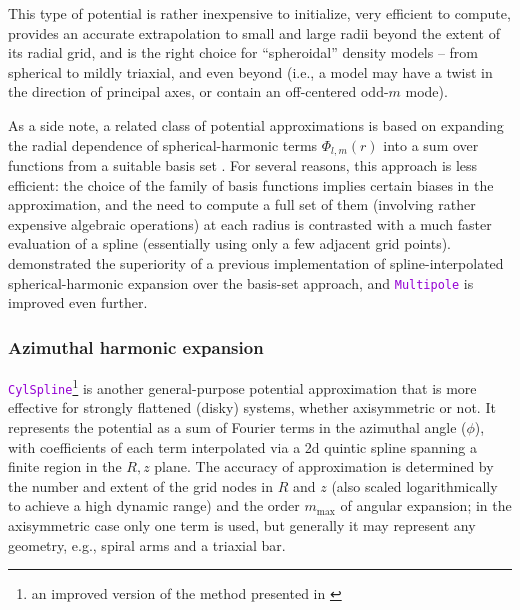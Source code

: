 \documentclass[12pt]{article}
\newcommand{\ttt}[1]{\textcolor{darkviolet}{\texttt{#1}}}
\begin{document}
This type of potential is rather inexpensive to initialize, very efficient to compute, provides an accurate extrapolation to small and large radii beyond the extent of its radial grid, and is the right choice for ``spheroidal'' density models -- from spherical to mildly triaxial, and even beyond (i.e., a model may have a twist in the direction of principal axes, or contain an off-centered odd-$m$ mode).

As a side note, a related class of potential approximations is based on expanding the radial dependence of spherical-harmonic terms $\Phi_{l,m}(r)$ into a sum over functions from a suitable basis set \cite{HernquistOstriker1992,Zhao1996}. For several reasons, this approach is less efficient: the choice of the family of basis functions implies certain biases in the approximation, and the need to compute a full set of them (involving rather expensive algebraic operations) at each radius is contrasted with a much faster evaluation of a spline (essentially using only a few adjacent grid points). \cite{Vasiliev2013} demonstrated the superiority of a previous implementation of spline-interpolated spherical-harmonic expansion over the basis-set approach, and \ttt{Multipole} is improved even further. 

\subsubsection{Azimuthal harmonic expansion}  \label{sec:PotentialCylSpline}

\ttt{CylSpline}\footnote{an improved version of the method presented in \cite{VasilievAthanassoula2015}} is another general-purpose potential approximation that is more effective for strongly flattened (disky) systems, whether axisymmetric or not. It represents the potential as a sum of Fourier terms in the azimuthal angle ($\phi$), with coefficients of each term interpolated via a 2d quintic spline spanning a finite region in the $R,z$ plane. The accuracy of approximation is determined by the number and extent of the grid nodes in $R$ and $z$ (also scaled logarithmically to achieve a high dynamic range) and the order $m_\mathrm{max}$ of angular expansion; in the axisymmetric case only one term is used, but generally it may represent any geometry, e.g., spiral arms and a triaxial bar.
\end{document}
